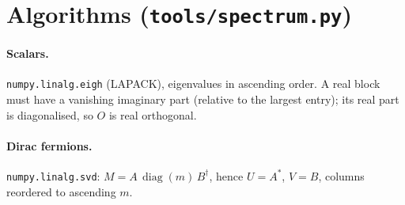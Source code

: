 \documentclass[11pt]{article}
\newcommand{\code}[1]{\texttt{#1}}
\newcommand{\diag}{\operatorname{diag}}
\begin{document}
\section{Algorithms (\code{tools/spectrum.py})}

\paragraph{Scalars.} \code{numpy.linalg.eigh} (LAPACK), eigenvalues in ascending order. A
real block must have a vanishing imaginary part (relative to the largest entry); its real part
is diagonalised, so $O$ is real orthogonal.

\paragraph{Dirac fermions.} \code{numpy.linalg.svd}: $M = A\,\diag(m)\,B^\dagger$, hence
$U = A^*$, $V = B$, columns reordered to ascending $m$.
\end{document}

